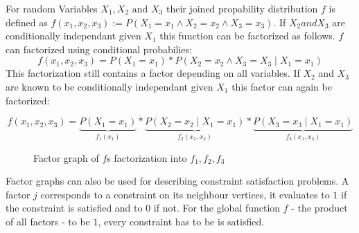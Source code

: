 \begin{example}
For random Variables $X_1, X_2 \text{ and } X_3$ their joined propability distribution $f$ is defined as $f(x_1, x_2, x_3) := P(X_1 = x_1 \land X_2  = x_2 \land X_3 = x_3)$. If $X_2 and X_3$ are conditionally independant given $X_1$ this function can be factorized as follows. $f$ can factorized using conditional probabilies: $$f(x_1, x_2, x_3) = P(X_1 = x_1) * P(X_2 = x_2 \land X_3 = X_3 \; | \; X_1 = x_1)$$
This factorization still contains a factor depending on all variables. If $X_2$ and $X_3$ are known to be conditionally independant given $X_1$ this factor can again be factorized:

$$f(x_1, x_2, x_3) = \underbrace{P(X_1 = x_1)}_{f_1(x_1)} * \underbrace{P(X_2 = x_2 \; | \; X_1 = x_1)}_{f_2(x_1, x_2)} * \underbrace{P(X_3 = x_3 \; | \; X_1 = x_1)}_{f_3(x_1, x_3)}$$

\begin{figure}
\centering

\caption{Factor graph of $f$s factorization into $f_1, f_2, f_3$}
\end{figure}
\end{example}
%

\newpage
Factor graphs can also be used for describing constraint satisfaction problems. A factor $j$ corresponds to a constraint on its neighbour vertices, it evaluates to $1$ if the constraint is satisfied and to $0$ if not. For the global function $f$ - the product of all factors - to be $1$, every constraint has to be is satisfied.  \newline


